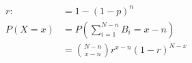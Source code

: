 \documentclass[12pt]{report}
\numberwithin{equation}{section}
\begin{document}
\begin{align*}
r: &=1-(1-p)^n \\
P(X=x)&=P\left(\sum_{i=1}^{N-n}B_i=x-n\right) \\
&=\binom{N-n}{x-n}r^{x-n}(1-r)^{N-x}
\end{align*}






\end{document}
